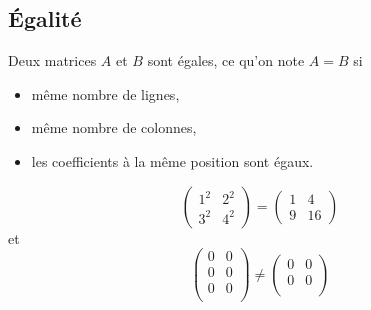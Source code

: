 \documentclass{book}
\begin{document}
\subsection{Égalité}
\begin{Definition}
Deux matrices $A$ et $B$ sont égales, ce qu'on note $A = B$ si
\begin{itemize}
\item même nombre de lignes,
\item même nombre de colonnes,
\item les coefficients à la même position sont égaux.
\end{itemize}
\end{Definition}
\begin{Exemple}
$$\begin{pmatrix}1^2&2^2\\3^2&4^2\end{pmatrix}=\begin{pmatrix}1&4\\9&16\end{pmatrix}$$
et
$$\begin{pmatrix}0&0\\0&0\\0&0\\\end{pmatrix}\neq\begin{pmatrix}0&0\\0&0\\\end{pmatrix}$$
\end{Exemple}
\end{document}
